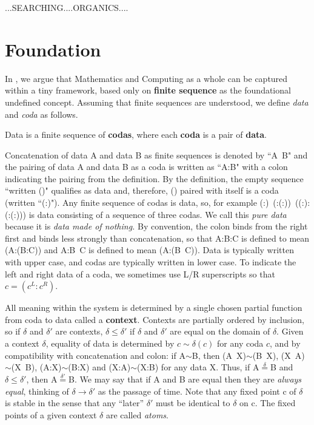 \documentclass[11pt]{article}
\begin{document}
...SEARCHING....ORGANICS....

\section{Foundation}  

In \cite{PDF}, we argue that Mathematics and Computing as a whole can be captured within a tiny framework, based only on {\bf finite sequence} as the foundational undefined concept.  Assuming that finite sequences are understood, we define {\it data} and {\it coda} as follows.   

\begin{definition} {Data is a finite sequence of {\bf codas}, where each {\bf coda} is a pair of {\bf data}.}
\end{definition}

\noindent Concatenation of data A and data B as finite sequences is denoted by ``A\ B" and the pairing of data A and data B as a coda is written as ``A:B" with a colon indicating 
the pairing from the definition.  
By the definition, the empty sequence ``written ()" qualifies as data and, therefore, () paired with itself is a coda (written ``(:)").  Any finite sequence of codas is data, so, for example (:)\ (:(:))\ ((:):(:(:))) is  
data consisting of a sequence of three codas.  We call this {\it pure data} because it is {\it data made of nothing.}  By convention, the colon binds from the right first and binds less strongly than concatenation, so that A:B:C is defined to mean (A:(B:C)) and A:B\ C is defined to mean (A:(B\ C)).  Data is typically written with upper case, and codas are typically written in lower case.  To indicate the left and right data of a coda, we sometimes use L/R superscripts so that $c=(c^L:c^R)$. 

     All meaning within the system is determined by a single chosen partial function from coda to data called a {\bf context}. 
Contexts are partially ordered by inclusion, so if $\delta$ and $\delta'$ are contexts, $\delta\le\delta'$ if $\delta$ and $\delta'$ are equal on the domain of $\delta$.  
Given a context $\delta$, equality of data is determined by $c\sim \delta(c)$ for any coda $c$, and by compatibility with concatenation and colon: if A$\sim$B, then (A\ X)$\sim$(B\ X), (X\ A)$\sim$(X\ B), (A:X)$\sim$(B:X) and (X:A)$\sim$(X:B) for any data X.
Thus, if A${\overset \delta =}$B and $\delta\leq\delta'$, then A${\overset {\delta'} =}$B.  We may say that if A and B are equal then they are {\it always equal}, thinking of $\delta\rightarrow\delta'$ as the passage of time.  Note that any fixed point c of $\delta$ is stable in the sense that any ``later'' $\delta'$ must be identical to $\delta$ on c.  The fixed points of a given context $\delta$ are called {\it atoms}.  
\end{document}
